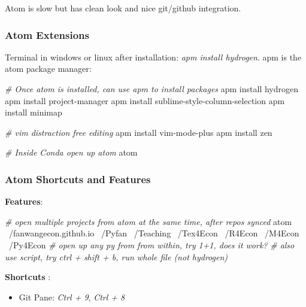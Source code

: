 \documentclass[]{article}
\newenvironment{Shaded}{\begin{snugshade}}{\end{snugshade}}
\newcommand{\CommentTok}[1]{\textcolor[rgb]{0.56,0.35,0.01}{\textit{#1}}}
\newcommand{\ExtensionTok}[1]{#1}
\newcommand{\FunctionTok}[1]{\textcolor[rgb]{0.00,0.00,0.00}{#1}}
\newcommand{\NormalTok}[1]{#1}
\providecommand{\tightlist}{%
  \setlength{\itemsep}{0pt}\setlength{\parskip}{0pt}}
\begin{document}
Atom is slow but has clean look and nice git/github integration.

\hypertarget{atom-extensions}{%
\subsubsection{Atom Extensions}\label{atom-extensions}}

Terminal in windows or linux after installation: \emph{apm install
hydrogen}. apm is the atom package manager:

\begin{Shaded}
\begin{Highlighting}[]
\CommentTok{# Once atom is installed, can use apm to install packages}
\FunctionTok{apm}\NormalTok{ install hydrogen}
\FunctionTok{apm}\NormalTok{ install project-manager}
\FunctionTok{apm}\NormalTok{ install sublime-style-column-selection}
\FunctionTok{apm}\NormalTok{ install minimap}

\CommentTok{# vim distraction free editing}
\FunctionTok{apm}\NormalTok{ install vim-mode-plus}
\FunctionTok{apm}\NormalTok{ install zen}

\CommentTok{# Inside Conda open up atom}
\ExtensionTok{atom}
\end{Highlighting}
\end{Shaded}

\hypertarget{atom-shortcuts-and-features}{%
\subsubsection{Atom Shortcuts and
Features}\label{atom-shortcuts-and-features}}

\textbf{Features}:

\begin{Shaded}
\begin{Highlighting}[]
\CommentTok{# open multiple projects from atom at the same time, after repos synced}
\ExtensionTok{atom}\NormalTok{ ~/fanwangecon.github.io ~/Pyfan ~/Teaching ~/Tex4Econ ~/R4Econ ~/M4Econ ~/Py4Econ}
\CommentTok{# open up any py from from within, try 1+1, does it work?}
\CommentTok{# also use script, try ctrl + shift + b, run whole file (not hydrogen)}
\end{Highlighting}
\end{Shaded}

\textbf{Shortcuts} :

\begin{itemize}
\tightlist
\item
  Git Pane: \emph{Ctrl + 9}, \emph{Ctrl + 8}
\end{itemize}
\end{document}
